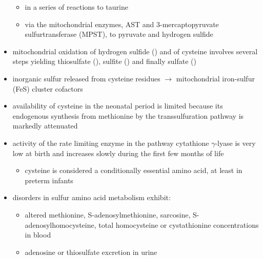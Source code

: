 \documentclass[12pt]{scrartcl}
\begin{document}
\begin{center}
\begin{center}
\begin{itemize}
\begin{itemize}
\item in a series of reactions to taurine
\item via the mitochondrial enzymes, AST and 3-mercaptopyruvate
sulfurtransferase (MPST), to pyruvate and hydrogen sulfide
\end{itemize}
\item mitochondrial oxidation of hydrogen sulfide () and of cysteine involves
several steps yielding thiosulfate (), sulfite
() and finally sulfate ()
\item inorganic sulfur released from cysteine residues \(\to\) mitochondrial
iron-sulfur (FeS) cluster cofactors
\item availability of cysteine in the neonatal period is limited because
its endogenous synthesis from methionine by the transsulfuration
pathway is markedly attenuated
\item activity of the rate limiting enzyme in the pathway cytathione
\(\gamma\)-lyase is very low at birth and increases slowly during the
first few months of life
\begin{itemize}
\item cysteine is considered a conditionally essential amino acid, at
least in preterm infants
\end{itemize}

\item disorders in sulfur amino acid metabolism exhibit:
\begin{itemize}
\item altered methionine, S-adenosylmethionine, sarcosine, S-adenosylhomocysteine,
total homocysteine or cystathionine concentrations in blood
\item adenosine or thiosulfate excretion in urine
\end{itemize}
\end{itemize}



\end{center}
\end{center}
\end{document}
